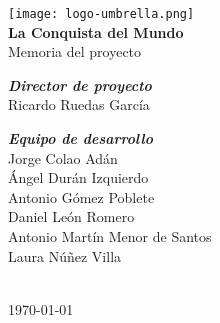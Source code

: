 \documentclass[a4paper,11pt,oneside]{report}
\begin{document}
\renewcommand\listtablename{Índice de tablas}
\renewcommand\tablename{Tabla}

\pagestyle{plain}



\begin{titlepage}
\begin{center}

\texttt{[image: logo-umbrella.png]}\\[4cm]

{\huge \textbf{La Conquista del Mundo}}\\[0.5cm]
{\huge {Memoria del proyecto}}\\[4cm]

\begin{minipage}{0.5\textwidth}
\large
\hspace{1cm}\textbf{\emph{Director de proyecto}}\\
Ricardo Ruedas García\\
\end{minipage}

\begin{minipage}{0.5\textwidth}
\large
\hspace{1cm}\textbf{\emph{Equipo de desarrollo}}\\
Jorge Colao Adán\\
Ángel Durán Izquierdo\\
Antonio Gómez Poblete\\
Daniel León Romero\\
Antonio Martín Menor de Santos\\
Laura Núñez Villa\\
\end{minipage}\\[2cm]

{\Large \today}
\end{center}
\end{titlepage}


\clearpage
{}
\setcounter{page}{2}

\tableofcontents
{}

\clearpage

\pagestyle{fancy}






\end{document}
